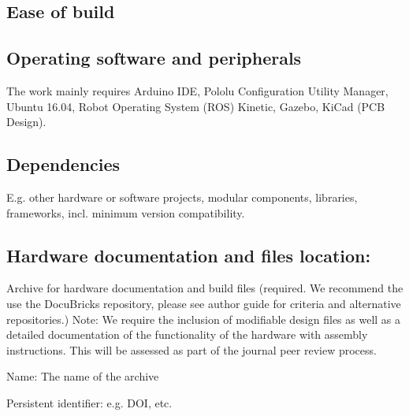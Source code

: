 \documentclass[a4paper]{article}
\begin{document}
\subsection{Ease of build}\label{h.wg823sgyb1e4}



\subsection{Operating software and peripherals}\label{h.uz77dixfh5i4}



The work mainly requires Arduino IDE, Pololu Configuration Utility Manager, Ubuntu 16.04, Robot Operating System (ROS) Kinetic, Gazebo, KiCad (PCB Design). 


\subsection{Dependencies}\label{h.vr0vnjs8z9ar}

E.g. other hardware or software projects, modular components,
libraries, frameworks, incl. minimum version compatibility.


\subsection{Hardware documentation and files location:}\label{h.nbisrsde6sc3}

Archive for hardware documentation and build files (required.
We recommend the use the DocuBricks repository, please see author guide for criteria and alternative
repositories.) Note: We require the inclusion of modifiable design
files as well as a detailed documentation of the functionality of the
hardware with assembly instructions. This will be assessed as part of
the journal peer review process.

Name: The name of the archive

Persistent identifier: e.g. DOI, etc.
\end{document}
